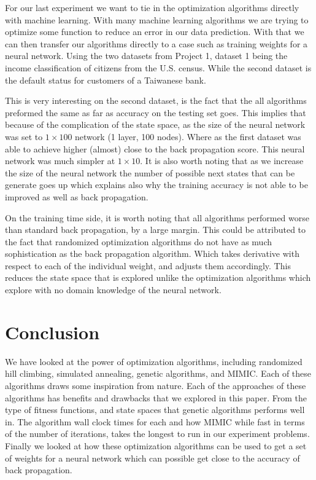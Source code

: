 \documentclass[
letterpaper, %
]{IEEEtran}
\begin{document}
	For our last experiment we want to tie in the optimization algorithms directly with machine learning. With many machine learning algorithms we are trying to optimize some function to reduce an error in our data prediction. With that we can then transfer our algorithms directly to a case such as training weights for a neural network. Using the two datasets from Project 1, dataset 1 being the income classification of citizens from the U.S. census. While the second dataset is the default status for customers of a Taiwanese bank.
	
	This is very interesting on the second dataset, is the fact that the all algorithms preformed the same as far as accuracy on the testing set goes. This implies that because of the complication of the state space, as the size of the neural network was set to $1 \times 100$ network (1 layer, 100 nodes). Where as the first dataset was able to achieve higher (almost) close to the back propagation score. This neural network was much simpler at $1 \times 10$. It is also worth noting that as we increase the size of the neural network the number of possible next states that can be generate goes up which explains also why the training accuracy is not able to be improved as well as back propagation.
	
	On the training time side, it is worth noting that all algorithms performed worse than standard back propagation, by a large margin. This could be attributed to the fact that randomized optimization algorithms do not have as much sophistication as the back propagation algorithm. Which takes derivative with respect to each of the individual weight, and adjusts them accordingly. This reduces the state space that is explored unlike the optimization algorithms which explore with no domain knowledge of the neural network.
	
	\section{Conclusion}
	We have looked at the power of optimization algorithms, including randomized hill climbing, simulated annealing, genetic algorithms, and MIMIC. Each of these algorithms draws some inspiration from nature. Each of the approaches of these algorithms has benefits and drawbacks that we explored in this paper. From the type of fitness functions, and state spaces that genetic algorithms performs well in. The algorithm wall clock times for each and how MIMIC while fast in terms of the number of iterations, takes the longest to run in our experiment problems. Finally we looked at how these optimization algorithms can be used to get a set of weights for a neural network which can possible get close to the accuracy of back propagation.
	
	\nocite{*}
	\printbibliography[
	heading=bibintoc,
	title={References}
	] %
\end{document}
